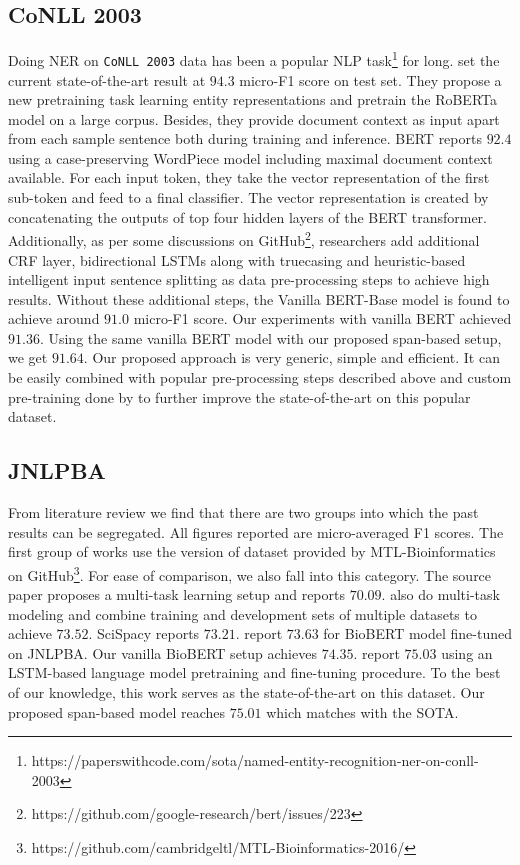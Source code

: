 \subsection{CoNLL 2003}
Doing NER on \texttt{CoNLL 2003} data has been a popular NLP task\footnote{https://paperswithcode.com/sota/named-entity-recognition-ner-on-conll-2003} for long. \cite{yamada2020luke} set the current state-of-the-art result at $94.3$ micro-F1 score on test set. They propose a new pretraining task learning entity representations and pretrain the RoBERTa model on a large corpus. Besides, they provide document context as input apart from each sample sentence both during training and inference. BERT\cite{devlin2018bert} reports $92.4$ using a case-preserving WordPiece model including maximal document context available. For each input token, they take the vector representation of the first sub-token and feed to a final classifier. The vector representation is created by concatenating the outputs of top four hidden layers of the BERT transformer. Additionally, as per some discussions on GitHub\footnote{https://github.com/google-research/bert/issues/223}, researchers add additional CRF layer, bidirectional LSTMs along with truecasing and heuristic-based intelligent input sentence splitting as data pre-processing steps to achieve high results. Without these additional steps, the Vanilla BERT-Base model is found to achieve around $91.0$ micro-F1 score. Our experiments with vanilla BERT achieved $91.36$. Using the same vanilla BERT model with our proposed span-based setup, we get $91.64$. Our proposed approach is very generic, simple and efficient. It can be easily combined with popular pre-processing steps described above and custom pre-training done by \cite{yamada2020luke} to further improve the state-of-the-art on this popular dataset.

\subsection{JNLPBA}
From literature review we find that there are two groups into which the past results can be segregated. All figures reported are micro-averaged F1 scores. The first group of works use the version of dataset provided by MTL-Bioinformatics\cite{crichton2017neural} on GitHub\footnote{https://github.com/cambridgeltl/MTL-Bioinformatics-2016/}. For ease of comparison, we also fall into this category. The source paper\cite{crichton2017neural} proposes a multi-task learning setup and reports $70.09$. \cite{wang2019cross} also do multi-task modeling and combine training and development sets of multiple datasets to achieve $73.52$. SciSpacy\cite{neumann2019scispacy} reports $73.21$. \cite{banerjee2019knowledge} report $73.63$ for BioBERT model fine-tuned on JNLPBA. Our vanilla BioBERT setup achieves $74.35$. \cite{sachan2018effective} report $75.03$ using an LSTM-based language model pretraining and fine-tuning procedure. To the best of our knowledge, this work serves as the state-of-the-art on this dataset. Our proposed span-based model reaches $75.01$ which matches with the SOTA.

